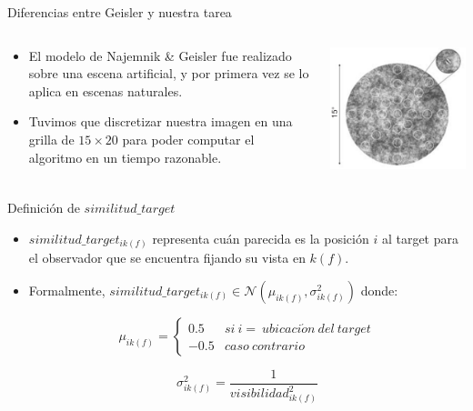\documentclass[compress]{beamer}
\begin{document}
\begin{frame}{Diferencias entre Geisler y nuestra tarea}
  \begin{columns}[T]
    \begin{column}{.6\textwidth}
        \begin{itemize}
        \item El modelo de Najemnik \& Geisler fue realizado sobre una escena artificial, y por primera vez se lo aplica en escenas naturales. 
        \item Tuvimos que discretizar nuestra imagen en una grilla de $15 \times 20$ para poder computar el algoritmo en un tiempo razonable.
        \end{itemize}
    \end{column}
    \begin{column}{.4\textwidth}
        \begin{center}
        \centering
        \includegraphics[width=0.85\linewidth]{images/geisler-task.png}
        \end{center}
    \end{column}
  \end{columns}
\end{frame}

\begin{frame}{Definición de $similitud\_target$}
\begin{itemize}
\item $similitud\_target_{ik(f)}$ representa cuán parecida es la posición $i$ al target para el observador que se encuentra fijando su vista en $k(f)$. 
\item Formalmente, $similitud\_target_{ik(f)} \in \mathcal{N}(\mu_{ik(f)}, \sigma^2_{ik(f)})$ donde:

$$ \mu_{ik(f)}
= \left\{ \begin{array}{lc}
             0.5 &  si \ i = \ ubicaci\acute{o}n \ del \ target \\
             -0.5 &  caso \ contrario 
          \end{array}
   \right.$$

$$ \sigma^2_{ik(f)} = \displaystyle\frac{1}{visibilidad^2_{ik(f)}}$$ 
\end{itemize}
\end{frame}
\end{document}
